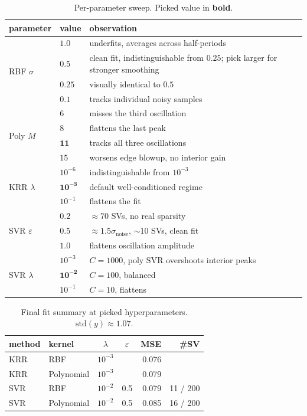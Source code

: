 \documentclass[10pt, a4paper]{article}
\begin{document}
\begin{table}[h]
\centering
\small
\caption{Per-parameter sweep. Picked value in \textbf{bold}.}
\label{tab:sweep}
\begin{tabular}{llll}
\toprule
parameter & value & observation \\
\midrule
\multirow{4}{*}{RBF $\sigma$}
  & $1.0$           & underfits, averages across half-periods \\
  & $\mathbf{0.5}$  & clean fit, indistinguishable from $0.25$; pick larger for stronger smoothing \\
  & $0.25$          & visually identical to $0.5$ \\
  & $0.1$           & tracks individual noisy samples \\
\midrule
\multirow{4}{*}{Poly $M$}
  & $6$             & misses the third oscillation \\
  & $8$             & flattens the last peak \\
  & $\mathbf{11}$   & tracks all three oscillations \\
  & $15$            & worsens edge blowup, no interior gain \\
\midrule
\multirow{3}{*}{KRR $\lambda$}
  & $10^{-6}$       & indistinguishable from $10^{-3}$ \\
  & $\mathbf{10^{-3}}$ & default well-conditioned regime \\
  & $10^{-1}$       & flattens the fit \\
\midrule
\multirow{3}{*}{SVR $\varepsilon$}
  & $0.2$           & $\approx 70$ SVs, no real sparsity \\
  & $\mathbf{0.5}$  & $\approx 1.5\hat\sigma_\text{noise}$, $\sim 10$ SVs, clean fit \\
  & $1.0$           & flattens oscillation amplitude \\
\midrule
\multirow{3}{*}{SVR $\lambda$}
  & $10^{-3}$       & $C{=}1000$, poly SVR overshoots interior peaks \\
  & $\mathbf{10^{-2}}$ & $C{=}100$, balanced \\
  & $10^{-1}$       & $C{=}10$, flattens \\
\bottomrule
\end{tabular}
\end{table}

\begin{table}[h]
\centering
\small
\caption{Final fit summary at picked hyperparameters. $\text{std}(y) \approx 1.07$.}
\label{tab:sine}
\begin{tabular}{llccrr}
\toprule
method & kernel & $\lambda$ & $\varepsilon$ & MSE & \#SV \\
\midrule
KRR & RBF        & $10^{-3}$ &     & 0.076 &     \\
KRR & Polynomial & $10^{-3}$ &     & 0.079 &     \\
SVR & RBF        & $10^{-2}$ & 0.5 & 0.079 & 11 / 200 \\
SVR & Polynomial & $10^{-2}$ & 0.5 & 0.085 & 16 / 200 \\
\bottomrule
\end{tabular}
\end{table}
\end{document}
